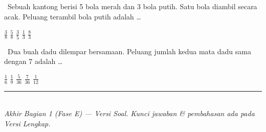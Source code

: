 \documentclass[11pt,a4paper]{exam}
\newcommand{\Inter}{{\footnotesize\textsf{\textcolor{biru}{[Intermediate]}}}\ }
\newcommand{\Adv}{{\footnotesize\textsf{\textcolor{oranye}{[Advanced]}}}\ }
\begin{document}
\begin{questions}
\question \Inter Sebuah kantong berisi 5 bola merah dan 3 bola putih. Satu bola
diambil secara acak. Peluang terambil bola putih adalah \dots
\begin{choices}
\CorrectChoice $\tfrac{3}{8}$ \choice $\tfrac{5}{8}$ \choice $\tfrac{3}{5}$ \choice $\tfrac{1}{3}$ \choice $\tfrac{8}{3}$
\end{choices}

\question \Adv Dua buah dadu dilempar bersamaan. Peluang jumlah kedua mata dadu
sama dengan 7 adalah \dots
\begin{choices}
\CorrectChoice $\tfrac{1}{6}$ \choice $\tfrac{1}{9}$ \choice $\tfrac{5}{36}$ \choice $\tfrac{7}{36}$ \choice $\tfrac{1}{12}$
\end{choices}

\end{questions}

\vspace{6pt}
\begin{center}
{\color{biru}\rule{\linewidth}{1pt}}\\[3pt]
{\small\textit{Akhir Bagian 1 (Fase E) — Versi Soal. Kunci jawaban \& pembahasan ada pada Versi Lengkap.}}
\end{center}
\end{document}
